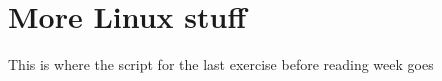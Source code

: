 \chapter{More Linux stuff}


\begin{note}
  This is where the script for the last exercise before reading week goes

\end{note}

